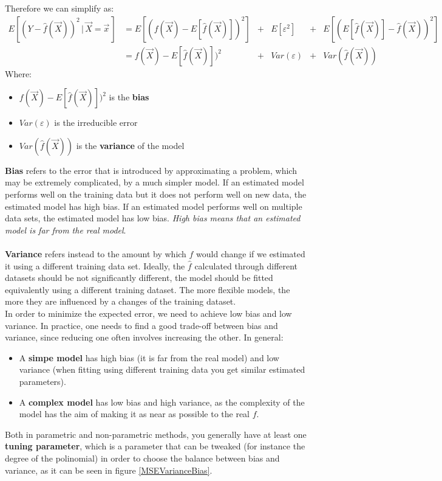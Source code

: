     Therefore we can simplify as:
    \begin{align*}
    E[(Y-\hat{f}(\vec{X}))^2 \,|\, \vec{X} = \vec{x}\,]
    & = E[(f(\vec{X}) - E[\hat{f}(\vec{X})])^2] &+ &E[\varepsilon^2] &+ &E[(E[\hat{f}(\vec{X})] - \hat{f}(\vec{X}))^2] \\
    & = f(\vec{X}) - E[\hat{f}(\vec{X})])^2 &+ &Var(\varepsilon) &+ &Var(\hat{f}(\vec{X})) 
    \end{align*} 
    Where:
    \begin{itemize}
      \item $f(\vec{X}) - E[\hat{f}(\vec{X})])^2$ is the \textbf{bias}
      \item $Var(\varepsilon)$ is the irreducible error
      \item $Var(\hat{f}(\vec{X}))$ is the \textbf{variance} of the model
    \end{itemize}
    \textbf{Bias} refers to the error that is introduced by approximating a problem, which may be extremely complicated, by a much
    simpler model. If an estimated model performs well on the training data but it does not perform well on new data, the estimated model has high bias. If an estimated model performs well on multiple data sets, the estimated model has low bias. \textit{High bias means that an estimated model is far from the real model}. \\\\
    \textbf{Variance} refers instead to the amount by which $\hat{f}$ would change if we
    estimated it using a different training data set. Ideally, the $\hat{f}$ calculated 
    through different datasets should be not significantly different, the model should be fitted equivalently using a different training dataset. The more flexible models, the more they are influenced by a changes of the training dataset. \\
    In order to minimize the expected error, we need to achieve low bias and low variance. In practice, one needs to find a good trade-off between bias and variance, since reducing one often involves increasing the other. In general:
    \begin{itemize}
      \item A \textbf{simpe model} has high bias (it is far from the real model) and low variance (when fitting using different training data you get similar estimated parameters).
      \item A \textbf{complex model} has low bias and high variance, as the complexity of the model has the aim of making it as near as possible to the real $ f $.
    \end{itemize}
    Both in parametric and non-parametric methods, you generally have at least one \textbf{tuning parameter}, which is a parameter that can be tweaked (for instance the degree of the polinomial) in order to choose the balance between bias and variance, as it can be seen in figure \ref{MSEVarianceBias}.
   
